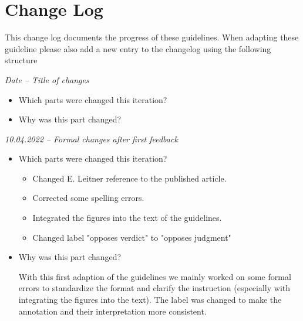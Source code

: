\documentclass{article}
\begin{document}
\section{Change Log}
This change log documents the progress of these guidelines. When adapting these guideline please also add a new entry to the changelog using the following structure
\begin{mdframed}[frametitle={Template}]
\emph{Date – Title of changes}
\begin{itemize}
	\item Which parts were changed this iteration?
    \item Why was this part changed?
\end{itemize}
\end{mdframed}
\begin{mdframed}[frametitle={}]
\emph{10.04.2022 – Formal changes after first feedback}
\begin{itemize}
	\item Which parts were changed this iteration? 
	\begin{itemize}
	    \item Changed E. Leitner reference to the published article.
	    \item Corrected some spelling errors.
	    \item Integrated the figures into the text of the guidelines.
	    \item Changed label "opposes verdict" to "opposes judgment"
	\end{itemize} 
    \item Why was this part changed?
    
    With this first adaption of the guidelines we mainly worked on some formal errors to standardize the format and clarify the instruction (especially with integrating the figures into the text). The label was changed to make the annotation and their interpretation more consistent.

\end{itemize}
\end{mdframed}
\end{document}
